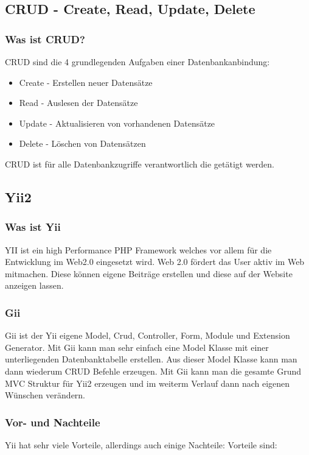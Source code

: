 \subsection{CRUD - Create, Read, Update, Delete} \label{sec:CRUD}

\subsubsection{Was ist CRUD?}
CRUD sind die 4 grundlegenden Aufgaben einer Datenbankanbindung:
\begin{itemize}
	\item Create - Erstellen neuer Datensätze
	\item Read - Auslesen der Datensätze
	\item Update - Aktualisieren von vorhandenen Datensätze
	\item Delete - Löschen von Datensätzen
\end{itemize}
\cite{CRUD}
\newline
CRUD ist für alle Datenbankzugriffe verantwortlich die getätigt werden.


\subsection{Yii2} \label{sec:YII2}

\subsubsection{Was ist Yii}
YII ist ein high Performance PHP Framework welches vor allem für die Entwicklung im Web2.0 eingesetzt wird. Web 2.0 fördert das User aktiv im Web mitmachen. Diese können eigene Beiträge erstellen und diese auf der Website anzeigen lassen.\cite{Web_2}

\subsubsection{Gii} \label{sec:gii}
Gii ist der Yii eigene Model, Crud, Controller, Form, Module und Extension Generator. Mit Gii kann man sehr einfach eine Model Klasse mit einer unterliegenden Datenbanktabelle erstellen. Aus dieser Model Klasse kann man dann wiederum CRUD Befehle erzeugen. Mit Gii kann man die gesamte Grund MVC Struktur für Yii2 erzeugen und im weiterm Verlauf dann nach eigenen Wünschen verändern.

\subsubsection{Vor- und Nachteile}
Yii hat sehr viele Vorteile, allerdings auch einige Nachteile:
\newline
Vorteile sind:

